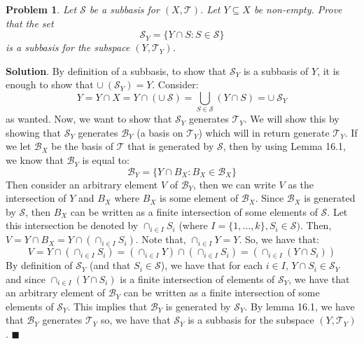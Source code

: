 \documentclass[12pt]{article}
\renewcommand{\=}[1]{\stackrel{#1}{=}} %
\providecommand{\T}{\mathcal{T}}
\newtheorem{p}{Problem}[section]
\theoremstyle{definition}
\newenvironment{s}{%
        \begin{trivlist} \item \textbf{Solution}. }{%
            \hspace*{\fill} $\blacksquare$\end{trivlist}}%
\begin{document}
\newpage

\begin{p}
    Let $\mathscr{S}$ be a subbasis for $(X,\T)$. Let $Y\subseteq X$ be non-empty. Prove that the set
    \[ \mathscr{S}_Y = \{Y\cap S: S\in\mathscr{S}\} \]
    is a subbasis for the subspace $(Y,\T_Y)$.
\end{p}
\begin{s}
    By definition of a subbasis, to show that $\mathscr{S}_{Y}$ is a subbasis of $Y$, it is enough to show that $\cup\:(\mathscr{S}_Y) = Y$. Consider:
    \[ Y = Y \cap X = Y \cap (\cup\:\mathscr{S}) = \bigcup_{S\in\mathscr{S}} (Y \cap S) = \cup\:\mathscr{S}_Y\]
    as wanted. Now, we want to show that $\mathscr{S}_Y$ generates $\T_Y$. 
    We will show this by showing that $\mathscr{S}_Y$ generates $\mathscr{B}_Y$ (a basis on
    $\T_Y$) which will in return generate $\T_Y$. If we let $\mathscr{B}_X$ be the basis of $\T$ that is generated by $\mathscr{S}$, then by 
    using Lemma 16.1, we know that $\mathscr{B}_Y$ is equal to:
    \[ \mathscr{B}_Y = \{Y \cap B_X: B_X\in\mathscr{B}_X\}\]
    Then consider an arbitrary element $V$ of $\mathscr{B}_Y$, then we can write $V$ as the intersection of $Y$ and $B_X$ where $B_X$ is some element
    of $\mathscr{B}_X$. Since $\mathscr{B}_X$ is generated by $\mathscr{S}$, then $B_X$ can be written as a finite intersection of some elements of
    $\mathscr{S}$. Let this intersection be denoted by $\cap_{i\in I} S_i$ (where $I = \{1,\hdots,k\}, S_i\in\mathscr{S})$. 
    Then, $V = Y \cap B_X = Y \cap (\cap_{i\in I} S_i)$. Note that, $\cap_{i\in I} Y = Y$. So, we have that:
    \[ V = Y \cap (\cap_{i\in I} S_i) = (\cap_{i\in I} Y) \cap (\cap_{i\in I} S_i) = (\cap_{i\in I} (Y \cap S_i))\]
    By definition of $\mathscr{S}_Y$ (and that $S_i\in\mathscr{S}$), we have that for each 
    $i\in I$, $Y \cap S_i\in\mathscr{S}_Y$ and since $\cap_{i\in I} (Y\cap S_i)$ is a finite intersection
    of elements of $\mathscr{S}_Y$, we have that an arbitrary element of $\mathscr{B}_Y$ can be written as a finite intersection of some elements of $\mathscr{S}_Y$.
    This implies that $\mathscr{B}_Y$ is generated by $\mathscr{S}_Y$. By lemma 16.1, we have that $\mathscr{B}_Y$ generates $\T_Y$ so, we have that
    $\mathscr{S}_Y$ is a subbasis for the subspace $(Y,\T_Y)$.
\end{s}
\end{document}
